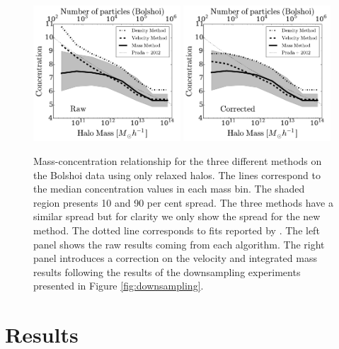 \documentclass{emulateapj}
\begin{document}
\begin{figure}
\begin{center}
  \includegraphics[width=0.49\textwidth]{concentration_bolshoi.pdf}
  \includegraphics[width=0.49\textwidth]{concentration_bolshoi_corrected.pdf}
\end{center}
\vspace{-0.5cm}
\caption{Mass-concentration relationship for the three different
  methods on the Bolshoi data using only relaxed halos.
  The lines correspond to the median concentration values in each mass
  bin.  
  The shaded region presents 10 and 90 per cent spread. 
  The three methods have a similar spread but for clarity we only show
  the spread for the new method.   
  The dotted line corresponds to fits reported by \citep{Prada2012}.
  The left panel shows the raw results coming from each algorithm. 
  The right panel introduces a correction on the velocity and
  integrated mass results following the results of the downsampling
  experiments presented in Figure 
  \ref{fig:downsampling}.
  \label{fig:concentration}} 
\end{figure}


\section{Results}
\label{sec:results}
\end{document}
